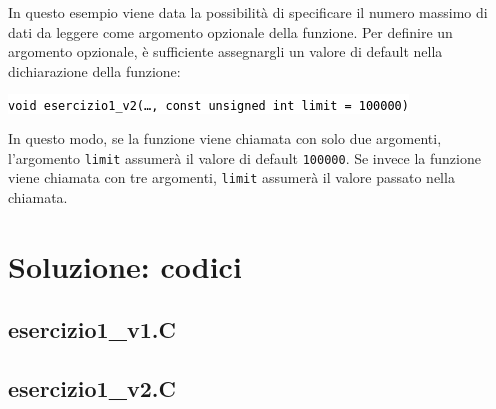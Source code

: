 \documentclass[10pt]{article}
\newcommand{\ttt}{\texttt}
\newcommand{\tcpp}[1]{\hspace{10pt}\colorbox{background}{\textcolor{black}{\texttt{#1}}}}
\begin{document}
In questo esempio viene data la possibilità di specificare il numero massimo di dati da leggere come argomento opzionale della funzione.
Per definire un argomento opzionale, è sufficiente assegnargli un valore di default nella dichiarazione della funzione:

    \tcpp{void esercizio1\_v2(\ldots, const unsigned int limit = 100000)}

In questo modo, se la funzione viene chiamata con solo due argomenti, l'argomento \ttt{limit} assumerà il valore di default \ttt{100000}.
Se invece la funzione viene chiamata con tre argomenti, \ttt{limit} assumerà il valore passato nella chiamata.

\newpage
\section{Soluzione: codici}

\subsection{esercizio1\_v1.C}


\newpage

\subsection{esercizio1\_v2.C}

\end{document}

